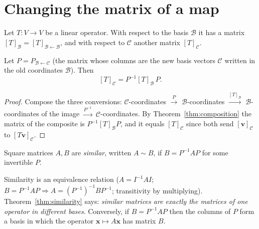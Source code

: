 \section{Changing the matrix of a map}

Let $T:V\to V$ be a linear operator. With respect to the basis $\mathcal{B}$ it has a matrix $[T]_{\mathcal{B}}=[T]_{\mathcal{B}\leftarrow\mathcal{B}}$, and with respect to $\mathcal{C}$ another matrix $[T]_{\mathcal{C}}$.

\begin{theorem}\label{thm:similarity}
Let $P=P_{\mathcal{B}\leftarrow\mathcal{C}}$ (the matrix whose columns are the new basis vectors $\mathcal{C}$ written in the old coordinates $\mathcal{B}$). Then
\[ [T]_{\mathcal{C}}=P^{-1}[T]_{\mathcal{B}}\,P. \]
\end{theorem}

\begin{proof}
Compose the three conversions: $\mathcal{C}$-coordinates $\xrightarrow{P}$ $\mathcal{B}$-coordinates $\xrightarrow{[T]_{\mathcal{B}}}$ $\mathcal{B}$-coordinates of the image $\xrightarrow{P^{-1}}$ $\mathcal{C}$-coordinates. By Theorem~\ref{thm:composition} the matrix of the composite is $P^{-1}[T]_{\mathcal{B}}P$, and it equals $[T]_{\mathcal{C}}$ since both send $[\mathbf{v}]_{\mathcal{C}}$ to $[T\mathbf{v}]_{\mathcal{C}}$.
\end{proof}

\begin{definition}
Square matrices $A,B$ are \emph{similar}, written $A\sim B$, if $B=P^{-1}AP$ for some invertible $P$.
\end{definition}

Similarity is an equivalence relation ($A=I^{-1}AI$; $B=P^{-1}AP\Rightarrow A=(P^{-1})^{-1}BP^{-1}$; transitivity by multiplying). Theorem~\ref{thm:similarity} says: \emph{similar matrices are exactly the matrices of one operator in different bases}. Conversely, if $B=P^{-1}AP$ then the columns of $P$ form a basis in which the operator $\mathbf{x}\mapsto A\mathbf{x}$ has matrix $B$.

